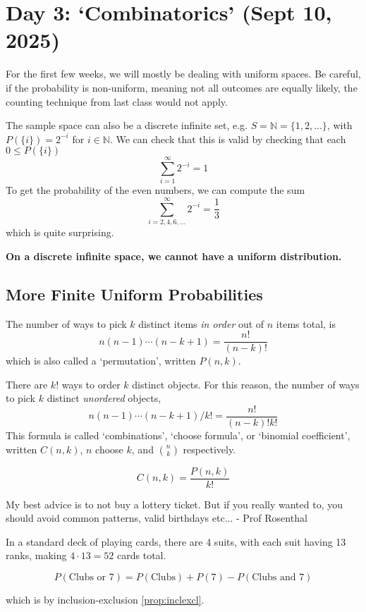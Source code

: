 \section{Day 3: `Combinatorics' (Sept 10, 2025)}

For the first few weeks, we will mostly be dealing with uniform spaces. Be careful, if the probability is non-uniform, meaning not all outcomes are equally likely, the counting technique from last class would not apply.

The sample space can also be a discrete infinite set, e.g. $S = \mathbb{N} = \{ 1, 2, \dots \}$, with $P(\{ i \}) = 2^{-i}$ for $i \in \mathbb{N}$. We can check that this is valid by checking that each $0 \leq P(\{ i \})$
\[
\sum_{i=1}^{\infty} 2^{-i} = 1
\]
To get the probability of the even numbers, we can compute the sum
\[
\sum_{i=2,4,6,\dots}^{\infty} 2^{-i} = \frac{1}{3}
\]
which is quite surprising.

\noindent \textbf{On a discrete infinite space, we cannot have a uniform distribution.}

\subsection{More Finite Uniform Probabilities}

The number of ways to pick $k$ distinct items \textit{in order} out of $n$ items total, is
\[
n(n-1) \cdots (n-k+1) = \frac{n!}{(n-k)!}
\]
which is also called a `permutation', written $P(n, k)$.

There are $k!$ ways to order $k$ distinct objects. For this reason, the number of ways to pick $k$ distinct \textit{unordered} objects,
\[
n(n-1) \cdots (n-k+1) / k! = \frac{n!}{(n-k)!k!}
\]
This formula is called `combinations', `choose formula', or `binomial coefficient', written $C(n, k)$, $n$ choose $k$, and $\binom{n}{k}$ respectively. 

\[
C(n, k) = \frac{P(n, k)}{k!}
\]

\begin{remark}
My best advice is to not buy a lottery ticket. But if you really wanted to, you should avoid common patterns, valid birthdays etc... - Prof Rosenthal
\end{remark}

In a standard deck of playing cards, there are 4 suits, with each suit having 13 ranks, making $4 \cdot 13 = 52$ cards total. 

\[
P(\text{Clubs or $7$}) = P(\text{Clubs}) + P(7) - P(\text{Clubs and $7$})
\]

\noindent which is by inclusion-exclusion \ref{prop:inclexcl}. 

